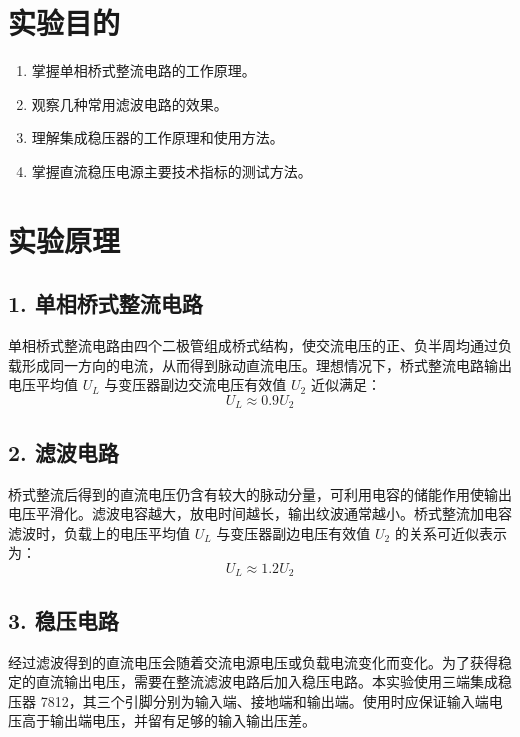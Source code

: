 ﻿\documentclass[10.5pt]{config}
\date{} %
\begin{document}
\makeheader %

\section{实验目的}

\begin{enumerate}[label=\arabic*., leftmargin=2em]
    \item 掌握单相桥式整流电路的工作原理。
    \item 观察几种常用滤波电路的效果。
    \item 理解集成稳压器的工作原理和使用方法。
    \item 掌握直流稳压电源主要技术指标的测试方法。
\end{enumerate}

\section{实验原理}

\subsection*{1. 单相桥式整流电路}
单相桥式整流电路由四个二极管组成桥式结构，使交流电压的正、负半周均通过负载形成同一方向的电流，从而得到脉动直流电压。理想情况下，桥式整流电路输出电压平均值 $U_L$ 与变压器副边交流电压有效值 $U_2$ 近似满足：
$$U_L \approx 0.9U_2$$

\subsection*{2. 滤波电路}
桥式整流后得到的直流电压仍含有较大的脉动分量，可利用电容的储能作用使输出电压平滑化。滤波电容越大，放电时间越长，输出纹波通常越小。桥式整流加电容滤波时，负载上的电压平均值 $U_L$ 与变压器副边电压有效值 $U_2$ 的关系可近似表示为：
$$U_L \approx 1.2U_2$$

\subsection*{3. 稳压电路}
经过滤波得到的直流电压会随着交流电源电压或负载电流变化而变化。为了获得稳定的直流输出电压，需要在整流滤波电路后加入稳压电路。本实验使用三端集成稳压器 7812，其三个引脚分别为输入端、接地端和输出端。使用时应保证输入端电压高于输出端电压，并留有足够的输入输出压差。
\end{document}
